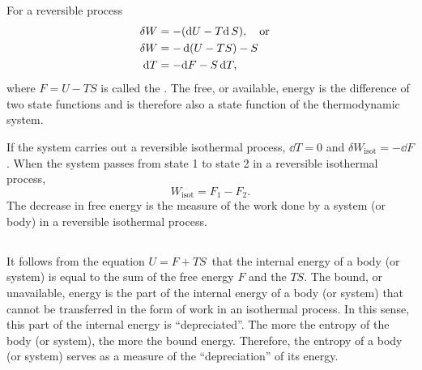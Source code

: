\subsection{}\label{11.4.5} For a reversible process 
\begin{align*}%
\delta W & = -(\dd U - T \dd  \, S), \qor \\
\delta W & = -\dd (U - T S) - S  \\ 
\dd T & = - \dd F - S  \, \dd T,
\end{align*}
where $F = U - TS$
is called the . The free, or available, energy is the difference of two state functions  and is therefore also a state function of the thermodynamic system.

If the system carries out a reversible isothermal process, $\dd T = 0$ and $\delta W_{\textrm{isot}} = - \dd F$. When the system passes from state 1 to state 2 in a reversible isothermal process,
\begin{equation*}%
W_{\textrm{isot}}  = F_{1} - F_{2}.
\end{equation*}
The decrease in free energy is the measure of the work done by a system (or body) in a reversible isothermal process.


\subsection{}\label{11.4.6} It follows from the equation $U = F + TS \, $ that the internal energy of a body (or system) is equal to the sum of the free energy $F$ and the  $TS$. The bound, or unavailable, energy is the part of the internal energy of a body (or system) that cannot be transferred in the form of work in an isothermal process. In this sense, this part of the internal energy is ``depreciated''. The more the entropy of the body (or system), the more the bound energy. Therefore, the entropy of a body (or system) serves as a measure of the ``depreciation'' of its energy.


